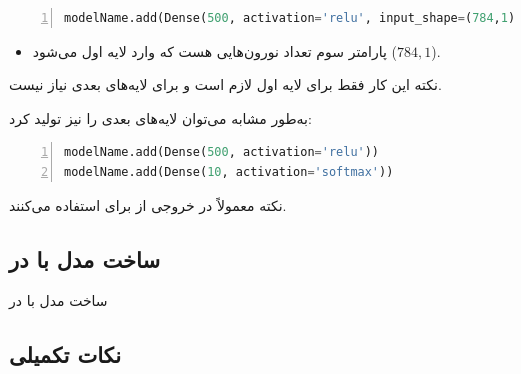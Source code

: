 \documentclass[10pt,xcolor=dvipsnames,professionalfont]{beamer}
\begin{document}
\begin{frame}[fragile]

\begin{latin}
\begin{lstlisting}[language=Python,frame=single,rulecolor=\color{magenta},numbers=left,numberstyle=\tiny]
modelName.add(Dense(500, activation='relu', input_shape=(784,1)))
\end{lstlisting}
\end{latin}

\begin{itemize}
\item
پارامتر سوم تعداد نورون‌هایی هست که وارد لایه اول می‌شود ($784, 1$).
\end{itemize}

\begin{block}{نکته}
این کار فقط برای لایه اول لازم است و برای لایه‌های بعدی نیاز نیست.
\end{block}
به‌طور مشابه می‌توان لایه‌های بعدی را نیز تولید کرد:
\begin{latin}
\begin{lstlisting}[language=Python,frame=single,rulecolor=\color{magenta},numbers=left,numberstyle=\tiny]
modelName.add(Dense(500, activation='relu'))
modelName.add(Dense(10, activation='softmax'))
\end{lstlisting}
\end{latin}

\begin{block}{نکته}
معمولاً در خروجی از  برای  استفاده می‌کنند.
\end{block}

\end{frame}

\subsection{ساخت مدل با  در }

\begin{frame}[fragile]{ساخت مدل با  در }


\end{frame}

\subsection{نکات تکمیلی}
\end{document}
